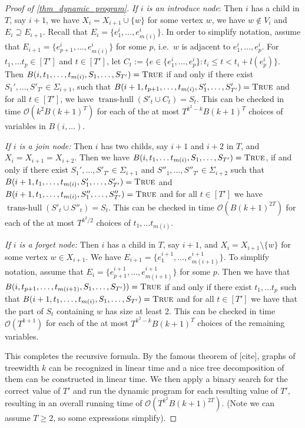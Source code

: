 \documentclass[10pt,a4paper]{article}
\numberwithin{equation}{section}
\newcommand{\set}[1]{\{ #1 \}}
\newcommand{\fromto}[2]{\set{#1, \ldots, #2}}
\newcommand{\bigO}{\mathcal{O}}
\newcommand{\dotunion}{\mathbin{\dot{\cup}}}
\newcommand{\True}{\textsc{True}}
\DeclareMathOperator{\transhull}{trans-hull}
\begin{document}
\begin{proof}[Proof of \cref{thm_dynamic_program}]
\emph{If $i$ is an introduce node}: Then $i$ has a child in $T$, say $i+1$, we have $X_i = X_{i+1} \dotunion \set{w}$ for some vertex $w$, we have $w \not\in V_i$ and $E_i \supseteq E_{i+1}$. Recall that $E_i = \fromto{e^i_1}{e^i_{m(i)}}$. In order to simplify notation, assume that $E_{i+1} = \fromto{e^i_{p+1}}{e^i_{m(i)}}$ for some $p$, i.e.\ $w$ is adjacent to $e^i_1, \ldots, e^i_p$. For $t_1, \ldots t_p \in [T']$ and $t \in [T']$, let $C_t := \set{e \in \fromto{e^i_1}{e^i_p} : t_i \leq t < t_i + l(e^i_p)}$. Then $B(i, t_1, \ldots, t_{m(i)}, S_1, \ldots, S_{T'}) = \True$ if and only if there exist $S_1', \ldots, S'_{T'} \in \Sigma_{i+1}$, such that $B(i+1, t_{p+1}, \ldots, t_{m(i)}, S_1', \ldots, S'_{T'}) = \True$ and for all $t \in [T']$, we have $\transhull(S'_t \cup C_t) = S_t$. This can be checked in time $\bigO(k^2B(k+1)^{T})$ for each of the at most $T^{k^2 - k}B(k+1)^T$ choices of variables in $B(i, \ldots)$. 


\emph{If $i$ is a join node:} Then $i$ has two childs, say $i+1$ and $i+2$ in $T$, and $X_i = X_{i+1} = X_{i+2}$. Then we have $B(i, t_1, \ldots t_{m(i)}, S_1, \ldots, S_{T'}) = \True$, if and only if there exist $S_1', \ldots, S'_{T'} \in \Sigma_{i+1}$ and $S''_1, \ldots, S''_{T'} \in \Sigma_{i+2}$ such that $B(i+1, t_1, \ldots, t_{m(i)}, S_1', \ldots, S'_{T'}) = \True$ and $B(i+1, t_1, \ldots, t_{m(i)}, S_1'', \ldots, S''_{T'}) = \True$ and for all $t \in [T']$ we have $\transhull(S'_t \cup S''_t) = S_t$. This can be checked in time $\bigO(B(k+1)^{2T})$ for each of the at most $T^{k^2/2}$ choices of $t_1, \ldots t_{m(i)}$.

\emph{If $i$ is a forget node:} Then $i$ has a child in $T$, say $i+1$, and $X_i = X_{i+1} \setminus \set{w}$ for some vertex $w \in X_{i+1}$. We have $E_{i+1} = \fromto{e^{i+1}_1}{e^{i+1}_{m(i+1)}}$. To simplify notation, assume that $E_i = \fromto{e^{i+1}_{p+1}}{e^{i+1}_{m(i+1)}}$ for some $p$. Then we have that $B(i, t_{p+1}, \ldots, t_{m(i+1)}, S_1, \ldots, S_{T'})) = \True$ if and only if there exist $t_1, \ldots t_p$ such that $B(i+1, t_1, \ldots, t_{m(i)}, S_1, \ldots, S_{T'}) = \True$ and for all $t \in [T']$ we have that the part of $S_t$ containing $w$ has size at least 2. This can be checked in time $\bigO(T^{k+1})$ for each of the at most $T^{k^2 - k}B(k+1)^T$ choices of the remaining variables.

This completes the recursive formula. By the famous theorem of [cite], graphs of treewidth $k$ can be recognized in linear time and a nice tree decomposition of them can be constructed in linear time. We then apply a binary search for the correct value of $T'$ and run the dynamic program for each resulting value of $T'$, resulting in an overall running time of $\bigO(T^{k^2}B(k+1)^{2T})$. (Note we can assume $T \geq 2$, so some expressions simplify).
 
\end{proof}
\end{document}
